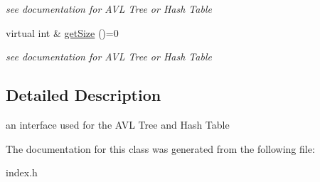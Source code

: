 \begin{DoxyCompactItemize}
\begin{DoxyCompactList}\small\item\em see documentation for A\-V\-L Tree or Hash Table \end{DoxyCompactList}\item 
\hypertarget{class_index_a0eccb696eb6548d60df4a4bce323191b}{virtual int \& \hyperlink{class_index_a0eccb696eb6548d60df4a4bce323191b}{get\-Size} ()=0}\label{class_index_a0eccb696eb6548d60df4a4bce323191b}

\begin{DoxyCompactList}\small\item\em see documentation for A\-V\-L Tree or Hash Table \end{DoxyCompactList}\end{DoxyCompactItemize}


\subsection{Detailed Description}
an interface used for the A\-V\-L Tree and Hash Table 

The documentation for this class was generated from the following file\-:\begin{DoxyCompactItemize}
\item 
index.\-h\end{DoxyCompactItemize}
